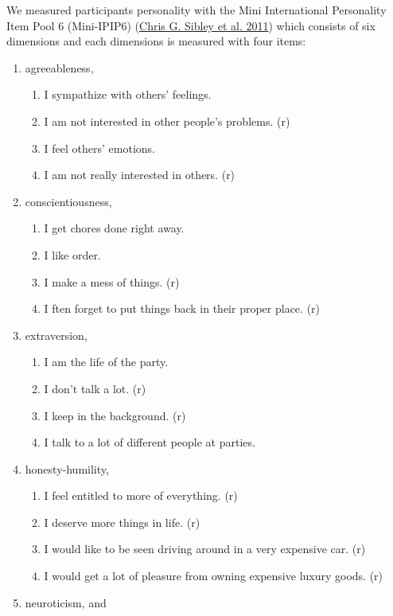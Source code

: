 \documentclass[
  singlecolumn]{report}
\providecommand{\tightlist}{%
  \setlength{\itemsep}{0pt}\setlength{\parskip}{0pt}}\usepackage{longtable,booktabs,array}
\begin{document}
We measured participants personality with the Mini International
Personality Item Pool 6 (Mini-IPIP6)
(\protect\hyperlink{ref-sibley2011}{Chris G. Sibley et al. 2011}) which
consists of six dimensions and each dimensions is measured with four
items:

\begin{enumerate}
\def\labelenumi{\arabic{enumi}.}
\item
  agreeableness,

  \begin{enumerate}
  \def\labelenumii{\roman{enumii}.}
  \tightlist
  \item
    I sympathize with others' feelings.
  \item
    I am not interested in other people's problems. (r)
  \item
    I feel others' emotions.
  \item
    I am not really interested in others. (r)
  \end{enumerate}
\item
  conscientiousness,

  \begin{enumerate}
  \def\labelenumii{\roman{enumii}.}
  \tightlist
  \item
    I get chores done right away.
  \item
    I like order.
  \item
    I make a mess of things. (r)
  \item
    I ften forget to put things back in their proper place. (r)
  \end{enumerate}
\item
  extraversion,

  \begin{enumerate}
  \def\labelenumii{\roman{enumii}.}
  \tightlist
  \item
    I am the life of the party.
  \item
    I don't talk a lot. (r)
  \item
    I keep in the background. (r)
  \item
    I talk to a lot of different people at parties.
  \end{enumerate}
\item
  honesty-humility,

  \begin{enumerate}
  \def\labelenumii{\roman{enumii}.}
  \tightlist
  \item
    I feel entitled to more of everything. (r)
  \item
    I deserve more things in life. (r)
  \item
    I would like to be seen driving around in a very expensive car. (r)
  \item
    I would get a lot of pleasure from owning expensive luxury goods.
    (r)
  \end{enumerate}
\item
  neuroticism, and


\end{enumerate}
\end{document}

